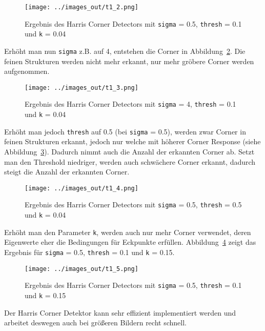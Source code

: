 \begin{figure}[htb]
 \centering
 \texttt{[image: ../images\_out/t1\_2.png]}
 \caption{Ergebnis des Harris Corner Detectors mit \texttt{sigma} = 0.5, \texttt{thresh} = 0.1 und \texttt{k} = 0.04}
 \label{fig:t1_2}
\end{figure}

Erhöht man nun \texttt{sigma} z.B. auf 4, entstehen die Corner in Abbildung~\ref{fig:t1_3}. Die feinen Strukturen werden nicht mehr erkannt, nur mehr gröbere Corner werden aufgenommen.

\begin{figure}[htb]
 \centering
 \texttt{[image: ../images\_out/t1\_3.png]}
 \caption{Ergebnis des Harris Corner Detectors mit \texttt{sigma} = 4, \texttt{thresh} = 0.1 und \texttt{k} = 0.04}
 \label{fig:t1_3}
\end{figure}

Erhöht man jedoch \texttt{thresh} auf 0.5 (bei \texttt{sigma} = 0.5), werden zwar Corner in feinen Strukturen erkannt, jedoch nur welche mit höherer Corner Response (siehe Abbildung~\ref{fig:t1_4}). Dadurch nimmt auch die Anzahl der erkannten Corner ab. Setzt man den Threshold niedriger, werden auch schwächere Corner erkannt, dadurch steigt die Anzahl der erkannten Corner.

\begin{figure}[htb]
 \centering
 \texttt{[image: ../images\_out/t1\_4.png]}
 \caption{Ergebnis des Harris Corner Detectors mit \texttt{sigma} = 0.5, \texttt{thresh} = 0.5 und \texttt{k} = 0.04}
 \label{fig:t1_4}
\end{figure}

Erhöht man den Parameter \texttt{k}, werden auch nur mehr Corner verwendet, deren Eigenwerte eher die Bedingungen für Eckpunkte erfüllen. Abbildung~\ref{fig:t1_5} zeigt das Ergebnis für \texttt{sigma} = 0.5, \texttt{thresh} = 0.1 und \texttt{k} = 0.15.

\begin{figure}[htb]
 \centering
 \texttt{[image: ../images\_out/t1\_5.png]}
 \caption{Ergebnis des Harris Corner Detectors mit \texttt{sigma} = 0.5, \texttt{thresh} = 0.1 und \texttt{k} = 0.15}
 \label{fig:t1_5}
\end{figure}

\smallskip

Der Harris Corner Detektor kann sehr effizient implementiert werden und arbeitet deswegen auch bei größeren Bildern recht schnell.

